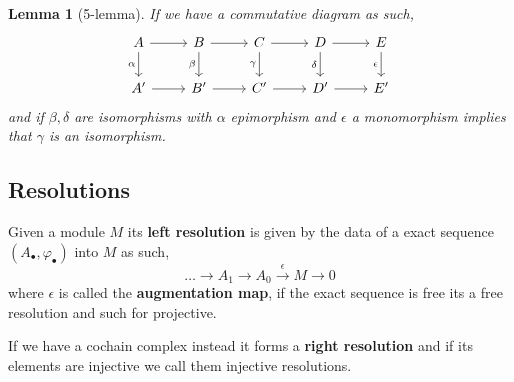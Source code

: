 \documentclass[12pt]{article}
\numberwithin{equation}{section}
\newcounter{dummy} \numberwithin{dummy}{section}
\newtheorem{lemma}[dummy]{Lemma}
\begin{document}
\begin{appendices}
	\begin{lemma}[5-lemma]
		If we have a commutative diagram as such,
		\[\begin{tikzcd}
			A & B & C & D & E \\
			{A'} & {B'} & {C'} & {D'} & {E'}
			\arrow[from=1-1, to=1-2]
			\arrow["\alpha"', from=1-1, to=2-1]
			\arrow[from=1-2, to=1-3]
			\arrow["\beta"', from=1-2, to=2-2]
			\arrow[from=1-3, to=1-4]
			\arrow["\gamma"', from=1-3, to=2-3]
			\arrow[from=1-4, to=1-5]
			\arrow["\delta"', from=1-4, to=2-4]
			\arrow["\epsilon"', from=1-5, to=2-5]
			\arrow[from=2-1, to=2-2]
			\arrow[from=2-2, to=2-3]
			\arrow[from=2-3, to=2-4]
			\arrow[from=2-4, to=2-5]
		\end{tikzcd}\]
		and if $\beta, \delta $ are isomorphisms with $\alpha $ epimorphism and $\epsilon $ a monomorphism implies that $\gamma $ is an isomorphism.
	\end{lemma}
	
	\subsection{Resolutions}
	Given a module $M$ its \textbf{left resolution} is given by the data of a exact sequence $(A_\bullet, \varphi_\bullet)$ into $M$ as such,
	\[ 	\dots \to A_1	\to A_0 \xrightarrow{\epsilon} M \to 0 \]
	where $\epsilon $ is called the \textbf{augmentation map}, if the exact sequence is free its a free resolution and such for projective. 
	
	If we have a cochain complex instead it forms a \textbf{right resolution} and if its elements are injective we call them injective resolutions.
	

\end{appendices}
\end{document}
